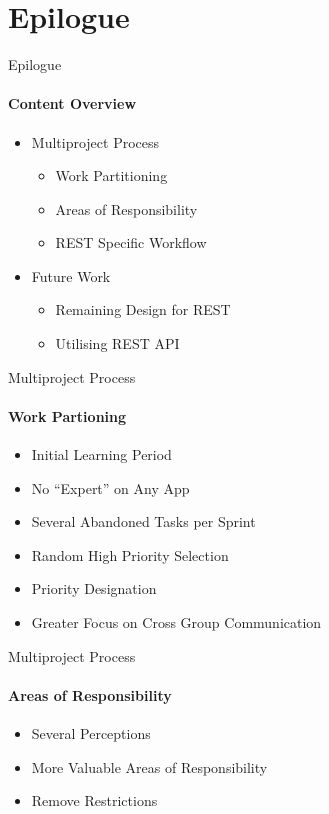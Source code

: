 \section{Epilogue}
    \begin{frame}[t]{Epilogue}\framesubtitle{Content Overview}
        \begin{itemize}
            \item Multiproject Process
            \begin{itemize}
                \item Work Partitioning
                \item Areas of Responsibility
                \item REST Specific Workflow
            \end{itemize}
            \item Future Work
            \begin{itemize}
                \item Remaining Design for REST
                \item Utilising REST API
            \end{itemize}
        \end{itemize}
    \end{frame}

    \begin{frame}[t]{Multiproject Process}\framesubtitle{Work Partioning}  
        \begin{itemize}
            \item Initial Learning Period
            \item No ``Expert'' on Any App
            \item Several Abandoned Tasks per Sprint
            \item Random High Priority Selection
            \item Priority Designation
            \item Greater Focus on Cross Group Communication
        \end{itemize}
    \end{frame}

    \begin{frame}[t]{Multiproject Process}\framesubtitle{Areas of Responsibility}
        \begin{itemize}
            \item Several Perceptions
            \item More Valuable Areas of Responsibility
            \item Remove Restrictions
        \end{itemize}
    \end{frame}

